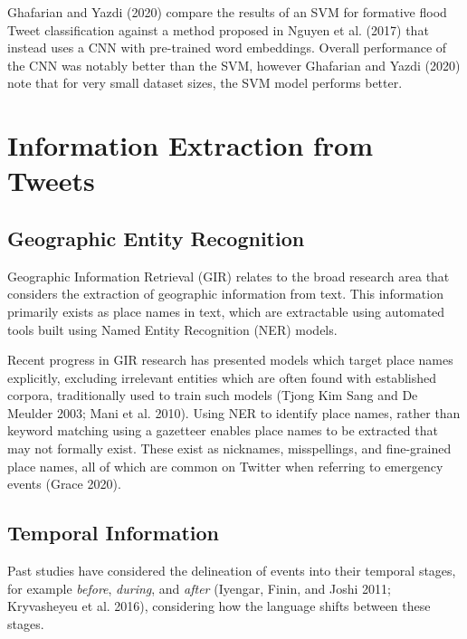 \documentclass[a4paper, notitlepage]{extreport}
\begin{document}
Ghafarian and Yazdi (2020) compare the results of an SVM for formative
flood Tweet classification against a method proposed in Nguyen et al.
(2017) that instead uses a CNN with pre-trained word embeddings. Overall
performance of the CNN was notably better than the SVM, however
Ghafarian and Yazdi (2020) note that for very small dataset sizes, the
SVM model performs better.

\hypertarget{information-extraction-from-tweets}{%
\section{Information Extraction from
Tweets}\label{information-extraction-from-tweets}}

\hypertarget{geographic-entity-recognition}{%
\subsection{Geographic Entity
Recognition}\label{geographic-entity-recognition}}

Geographic Information Retrieval (GIR) relates to the broad research
area that considers the extraction of geographic information from text.
This information primarily exists as place names in text, which are
extractable using automated tools built using Named Entity Recognition
(NER) models.

Recent progress in GIR research has presented models which target place
names explicitly, excluding irrelevant entities which are often found
with established corpora, traditionally used to train such models (Tjong
Kim Sang and De Meulder 2003; Mani et al. 2010). Using NER to identify
place names, rather than keyword matching using a gazetteer enables
place names to be extracted that may not formally exist. These exist as
nicknames, misspellings, and fine-grained place names, all of which are
common on Twitter when referring to emergency events (Grace 2020).

\hypertarget{temporal-information}{%
\subsection{Temporal Information}\label{temporal-information}}

Past studies have considered the delineation of events into their
temporal stages, for example \emph{before}, \emph{during}, and
\emph{after} (Iyengar, Finin, and Joshi 2011; Kryvasheyeu et al. 2016),
considering how the language shifts between these stages.
\end{document}
